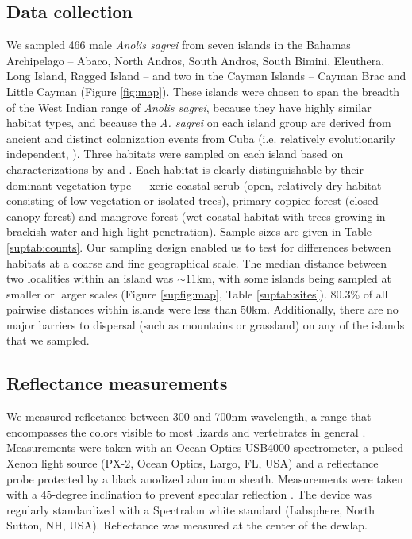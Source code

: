 
\subsection*{Data collection}
	
We sampled 466 male \textit{Anolis sagrei} from seven islands in the Bahamas Archipelago -- Abaco, North Andros, South Andros, South Bimini, Eleuthera, Long Island, Ragged Island -- and two in the Cayman Islands -- Cayman Brac and Little Cayman (Figure \ref{fig:map}). These islands were chosen to span the breadth of the West Indian range of \textit{Anolis sagrei}, because they have highly similar habitat types,  and because the \textit{A. sagrei} on each island group are derived from ancient and distinct colonization events from Cuba (i.e. relatively evolutionarily independent, \citealt{Reynolds2020}). Three habitats were sampled on each island based on characterizations by \citet{Howard1950} and \citet{Schoener1968}. Each habitat is clearly distinguishable by their dominant vegetation type --- xeric coastal scrub (open, relatively dry habitat consisting of low vegetation or isolated trees), primary coppice forest (closed-canopy forest) and mangrove forest (wet coastal habitat with trees growing in brackish water and high light penetration). Sample sizes are given in Table \ref{suptab:counts}. Our sampling design enabled us to test for differences between habitats at a coarse and fine geographical scale. The median distance between two localities within an island was $\sim 11$km, with some islands being sampled at smaller or larger scales (Figure \ref{supfig:map}, Table \ref{suptab:sites}). $80.3$\% of all pairwise distances within islands were less than $50$km. Additionally, there are no major barriers to dispersal (such as mountains or grassland) on any of the islands that we sampled.
	
\subsection*{Reflectance measurements}

We measured reflectance between 300 and 700nm wavelength, a range that encompasses the colors visible to most lizards and vertebrates in general \citep{Lazareva2012}. Measurements were taken with an Ocean Optics USB4000 spectrometer, a pulsed Xenon light source (PX-2, Ocean Optics, Largo, FL, USA) and a reflectance probe protected by a black anodized aluminum sheath. Measurements were taken with a 45-degree inclination to prevent specular reflection \citep{Endler1990}. The device was regularly standardized with a Spectralon white standard (Labsphere, North Sutton, NH, USA). Reflectance was measured at the center of the dewlap.

